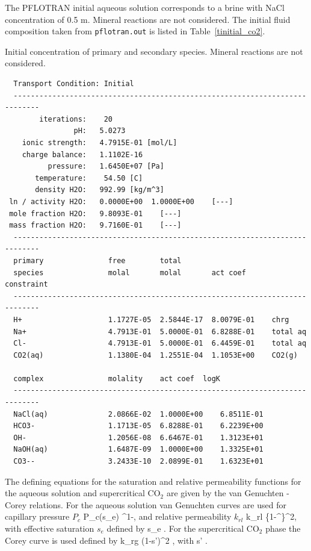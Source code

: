 The PFLOTRAN initial aqueous solution corresponds to a brine with NaCl concentration of 0.5 m. Mineral reactions are not considered. The initial fluid composition taken from {\tt pflotran.out} is listed in Table~\ref{tinitial_co2}.

\begin{table}[h]
\caption{Initial concentration of primary and secondary species. Mineral reactions are not considered.}
\label{tinitial_co2}
\footnotesize
\begin{verbatim}
  Transport Condition: Initial
  ----------------------------------------------------------------------------
        iterations:    20
                pH:   5.0273
    ionic strength:   4.7915E-01 [mol/L]
    charge balance:   1.1102E-16
          pressure:   1.6450E+07 [Pa]
       temperature:    54.50 [C]
       density H2O:   992.99 [kg/m^3]
 ln / activity H2O:   0.0000E+00  1.0000E+00    [---]
 mole fraction H2O:   9.8093E-01    [---]
 mass fraction H2O:   9.7160E-01    [---]
  ----------------------------------------------------------------------------
  primary               free        total
  species               molal       molal       act coef     constraint
  ----------------------------------------------------------------------------
  H+                    1.1727E-05  2.5844E-17  8.0079E-01    chrg
  Na+                   4.7913E-01  5.0000E-01  6.8288E-01    total aq
  Cl-                   4.7913E-01  5.0000E-01  6.4459E-01    total aq
  CO2(aq)               1.1380E-04  1.2551E-04  1.1053E+00    CO2(g)

  complex               molality    act coef  logK
  ----------------------------------------------------------------------------
  NaCl(aq)              2.0866E-02  1.0000E+00    6.8511E-01
  HCO3-                 1.1713E-05  6.8288E-01    6.2239E+00
  OH-                   1.2056E-08  6.6467E-01    1.3123E+01
  NaOH(aq)              1.6487E-09  1.0000E+00    1.3325E+01
  CO3--                 3.2433E-10  2.0899E-01    1.6323E+01
\end{verbatim}
\end{table}

\normalsize

The defining equations for the saturation and relative permeability functions for the aqueous solution and supercritical CO$_2$ are given by the van Genuchten -Corey relations. For the aqueous solution van Genuchten curves are used for capillary pressure $P_c$
\EQ\label{pc}
P_c(s_e) \eq {}^{1-\lambda},
\EN
and relative permeability $k_{rl}$
\EQ
k_{rl} \eq {}\left\{1-^\lambda\right\}^2,
\EN
with effective saturation $s_e$ defined by
\EQ
s_e \eq {}.
\EN
For the supercritical CO$_2$ phase the Corey curve is used defined by
\EQ
k_{rg} \eq \big(1-s'\big)^2 \big[1-(s')^2\big],
\EN
with
\EQ\label{sg}
s' \eq {}.
\EN

